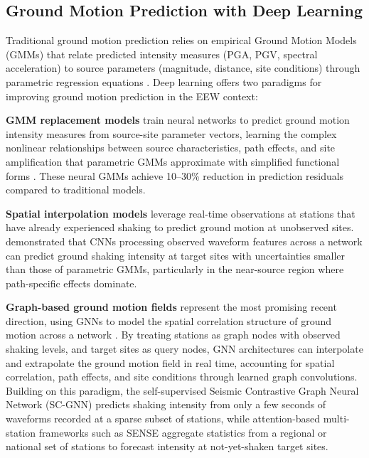 \documentclass[review,authoryear]{elsarticle}
\begin{document}
\subsection{Ground Motion Prediction with Deep Learning}

Traditional ground motion prediction relies on empirical Ground Motion Models (GMMs) that relate predicted intensity measures (PGA, PGV, spectral acceleration) to source parameters (magnitude, distance, site conditions) through parametric regression equations \citep{derras2014towards}. Deep learning offers two paradigms for improving ground motion prediction in the EEW context:

\textbf{GMM replacement models} train neural networks to predict ground motion intensity measures from source-site parameter vectors, learning the complex nonlinear relationships between source characteristics, path effects, and site amplification that parametric GMMs approximate with simplified functional forms \citep{derras2020deep, dhanya2020ground}. These neural GMMs achieve 10--30\% reduction in prediction residuals compared to traditional models.

\textbf{Spatial interpolation models} leverage real-time observations at stations that have already experienced shaking to predict ground motion at unobserved sites. \citet{jozinovic2020rapid} demonstrated that CNNs processing observed waveform features across a network can predict ground shaking intensity at target sites with uncertainties smaller than those of parametric GMMs, particularly in the near-source region where path-specific effects dominate.

\textbf{Graph-based ground motion fields} represent the most promising recent direction, using GNNs to model the spatial correlation structure of ground motion across a network \citep{bloemheuvel2022graph}. By treating stations as graph nodes with observed shaking levels, and target sites as query nodes, GNN architectures can interpolate and extrapolate the ground motion field in real time, accounting for spatial correlation, path effects, and site conditions through learned graph convolutions. Building on this paradigm, the self-supervised Seismic Contrastive Graph Neural Network (SC-GNN) \citep{murshed2024scgnn} predicts shaking intensity from only a few seconds of waveforms recorded at a sparse subset of stations, while attention-based multi-station frameworks such as SENSE \citep{huang2024sense} aggregate statistics from a regional or national set of stations to forecast intensity at not-yet-shaken target sites.
\end{document}
